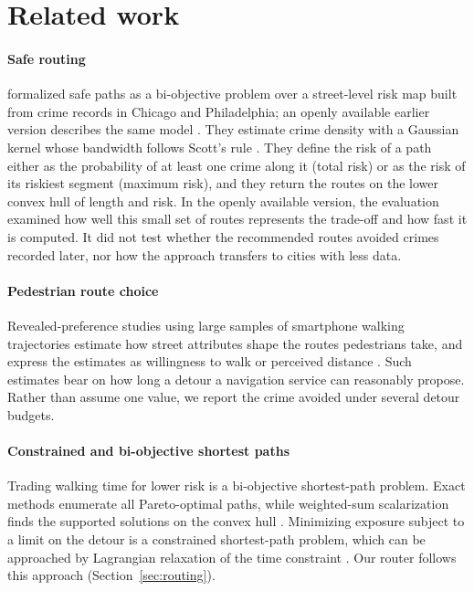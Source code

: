 \documentclass[preprint,12pt,authoryear]{elsarticle}
\begin{document}
\section{Related work}

\paragraph{Safe routing} \citet{galbrun2016safe} formalized safe paths as a bi-objective problem over a street-level risk map built from crime records in Chicago and Philadelphia; an openly available earlier version describes the same model \citep{galbrun2014safe}. They estimate crime density with a Gaussian kernel whose bandwidth follows Scott's rule \citep{scott1992multivariate}. They define the risk of a path either as the probability of at least one crime along it (total risk) or as the risk of its riskiest segment (maximum risk), and they return the routes on the lower convex hull of length and risk. In the openly available version, the evaluation examined how well this small set of routes represents the trade-off and how fast it is computed. It did not test whether the recommended routes avoided crimes recorded later, nor how the approach transfers to cities with less data.

\paragraph{Pedestrian route choice} Revealed-preference studies using large samples of smartphone walking trajectories estimate how street attributes shape the routes pedestrians take, and express the estimates as willingness to walk or perceived distance \citep{sevtsuk2021routechoice,basu2022willingness}. Such estimates bear on how long a detour a navigation service can reasonably propose. Rather than assume one value, we report the crime avoided under several detour budgets.

\paragraph{Constrained and bi-objective shortest paths} Trading walking time for lower risk is a bi-objective shortest-path problem. Exact methods enumerate all Pareto-optimal paths, while weighted-sum scalarization finds the supported solutions on the convex hull \citep{raith2009biobjective}. Minimizing exposure subject to a limit on the detour is a constrained shortest-path problem, which can be approached by Lagrangian relaxation of the time constraint \citep{handler1980dual}. Our router follows this approach (Section~\ref{sec:routing}).
\end{document}
